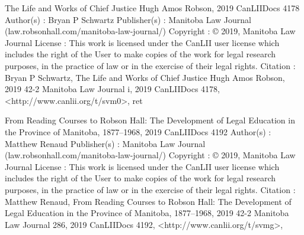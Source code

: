 The Life and Works of Chief Justice Hugh Amos Robson, 2019 CanLIIDocs 4178
Author(s) : 	Bryan P Schwartz
Publisher(s) : 	Manitoba Law Journal (law.robsonhall.com/manitoba-law-journal/)
Copyright : 	© 2019, Manitoba Law Journal
License : 	This work is licensed under the CanLII user license which includes the right of the User to make copies of the work for legal research purposes, in the practice of law or in the exercise of their legal rights.
Citation : 	Bryan P Schwartz, The Life and Works of Chief Justice Hugh Amos Robson, 2019 42-2 Manitoba Law Journal i, 2019 CanLIIDocs 4178, <http://www.canlii.org/t/svm0>, ret


From Reading Courses to Robson Hall: The Development of Legal Education in the Province of Manitoba, 1877–1968, 2019 CanLIIDocs 4192
Author(s) : 	Matthew Renaud
Publisher(s) : 	Manitoba Law Journal (law.robsonhall.com/manitoba-law-journal/)
Copyright : 	© 2019, Manitoba Law Journal
License : 	This work is licensed under the CanLII user license which includes the right of the User to make copies of the work for legal research purposes, in the practice of law or in the exercise of their legal rights.
Citation : 	Matthew Renaud, From Reading Courses to Robson Hall: The Development of Legal Education in the Province of Manitoba, 1877–1968, 2019 42-2 Manitoba Law Journal 286, 2019 CanLIIDocs 4192, <http://www.canlii.org/t/svmg>,


